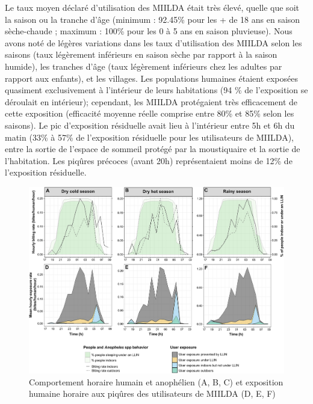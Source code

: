 \documentclass[12pt,twoside]{reedthesis}
\begin{document}
Le taux moyen déclaré d'utilisation des MIILDA était très élevé, quelle que soit la saison ou la tranche d'âge (minimum : 92.45\% pour les + de 18 ans en saison sèche-chaude ; maximum : 100\% pour les 0 à 5 ans en saison pluvieuse). Nous avons noté de légères variations dans les taux d'utilisation des MIILDA selon les saisons (taux légèrement inférieurs en saison sèche par rapport à la saison humide), les tranches d'âge (taux légèrement inférieurs chez les adultes par rapport aux enfants), et les villages.
Les populations humaines étaient exposées quasiment exclusivement à l'intérieur de leurs habitations (94 \% de l'exposition se déroulait en intérieur); cependant, les MIILDA protégaient très efficacement de cette exposition (efficacité moyenne réelle comprise entre 80\% et 85\% selon les saisons). Le pic d'exposition résiduelle avait lieu à l'intérieur entre 5h et 6h du matin (33\% à 57\% de l'exposition résiduelle pour les utilisateurs de MIILDA), entre la sortie de l'espace de sommeil protégé par la moustiquaire et la sortie de l'habitation. Les piqûres précoces (avant 20h) représentaient moins de 12\% de l'exposition résiduelle.\\
\begin{figure}

{\centering \includegraphics[width=.9\linewidth]{figure/human_exposure_bf} 

}

\caption[Comportement horaire humain et anophélien et exposition humaine horaire aux piqûres des utilisateurs de MIILDA]{Comportement horaire humain et anophélien (A, B, C) et exposition humaine horaire aux piqûres des utilisateurs de MIILDA (D, E, F)}\label{fig:human-exposure-bf}
\end{figure}
\end{document}
